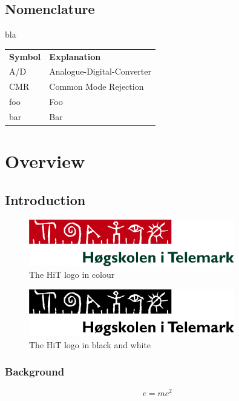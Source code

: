\documentclass[11pt,openright]{book} %
\begin{document}
\listoftables  %

\chapter*{Nomenclature}
\label{sec:summary}
bla

\begin{longtable}{ll}
  \textbf{Symbol} & \textbf{Explanation}\endhead\\
  A/D	& Analogue-Digital-Converter \\
  CMR	& Common Mode Rejection \\
  foo	& Foo \\
  bar 	& Bar
\end{longtable}


\mainmatter
\part{Overview}  %
\label{part:overview}
\chapter{Introduction}
\label{ch:intro}
\lipsum[4]
\begin{figure}[!ht]
  \centering
  \includegraphics[width=0.8\textwidth]{HiT-logo}
  \caption{The HiT logo in colour}
  \label{fig:hit-logo}
\end{figure}
\lipsum[4]
\begin{figure}[!ht]
  \centering
  \includegraphics[width=0.8\textwidth]{HiT-logo_bw}
  \caption{The HiT logo in black and white}
  \label{fig:hit-logo-bw}
\end{figure}
\lipsum

\section{Background}
\label{sec:back}
\lipsum[4]
\begin{equation}
  e = m c^2
\end{equation}
\lipsum
\end{document}
